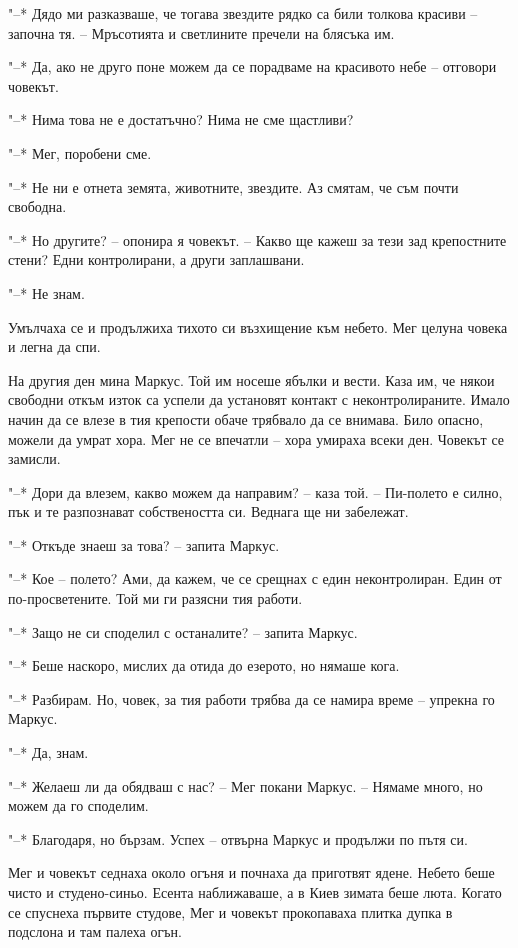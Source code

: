 \documentclass[ebook,openany,12pt]{memoir}
\begin{document}
"--* Дядо ми разказваше, че тогава звездите рядко са били толкова красиви – започна тя. – Мръсотията и светлините пречели на блясъка им.

"--* Да, ако не друго поне можем да се порадваме на красивото небе – отговори човекът.

"--* Нима това не е достатъчно? Нима не сме щастливи?

"--* Мег, поробени сме.

"--* Не ни е отнета земята, животните, звездите. Аз смятам, че съм почти свободна.

"--* Но другите? – опонира я човекът. – Какво ще кажеш за тези зад крепостните стени? Едни контролирани, а други заплашвани.

"--* Не знам.

Умълчаха се и продължиха тихото си възхищение към небето. Мег целуна човека и легна да спи.

На другия ден мина Маркус. Той им носеше ябълки и вести. Каза им, че някои свободни откъм изток са успели да установят контакт с неконтролираните. Имало начин да се влезе в тия крепости обаче трябвало да се внимава. Било опасно, можели да умрат хора. Мег не се впечатли – хора умираха всеки ден. Човекът се замисли.

"--* Дори да влезем, какво можем да направим? – каза той. – Пи-полето е силно, пък и те разпознават собствеността си. Веднага ще ни забележат.

"--* Откъде знаеш за това? – запита Маркус.

"--* Кое – полето? Ами, да кажем, че се срещнах с един неконтролиран. Един от по-просветените. Той ми ги разясни тия работи.

"--* Защо не си споделил с останалите? – запита Маркус.

"--* Беше наскоро, мислих да отида до езерото, но нямаше кога.

"--* Разбирам. Но, човек, за тия работи трябва да се намира време – упрекна го Маркус.

"--* Да, знам.

"--* Желаеш ли да обядваш с нас? -- Мег покани Маркус. -- Нямаме много, но можем да го споделим.

"--* Благодаря, но бързам. Успех – отвърна Маркус и продължи по пътя си.

Мег и човекът седнаха около огъня и почнаха да приготвят ядене. Небето беше чисто и студено-синьо. Есента наближаваше, а в Киев зимата беше люта. Когато се спуснеха първите студове, Мег и човекът прокопаваха плитка дупка в подслона и там палеха огън.
\end{document}
